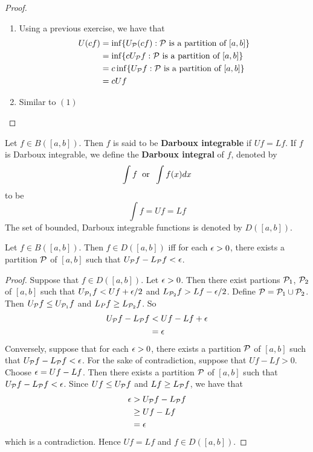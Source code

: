 \documentclass{book}
\begin{document}
	\begin{proof}\
		\begin{enumerate}
			\item Using a previous exercise, we have that
			\begin{align*}
				U(cf) 
				&= \inf \{U_{\mathcal{P}} (cf): \mathcal{P} \text{ is a partition of } [a,b]\} \\
				&= \inf \{c U_{\mathcal{P}} f: \mathcal{P} \text{ is a partition of } [a,b]\} \\
				&= c \inf \{U_{\mathcal{P}} f: \mathcal{P} \text{ is a partition of } [a,b]\} \\
				&= c Uf
			\end{align*}
			\item Similar to $(1)$
		\end{enumerate}
	\end{proof}

	\begin{defn}  
		Let $f \in B([a,b])$. Then $f$ is said to be \textbf{Darboux integrable} if $Uf = Lf$. If $f$ is Darboux integrable, we define the \textbf{Darboux integral} of $f$, denoted by $$\int f \hspace{.2cm} \text{or} \hspace{.2cm} \int f(x) dx$$ to be $$\int f = Uf = Lf$$ The set of bounded, Darboux integrable functions is denoted by $D([a,b])$.
	\end{defn}

	\begin{ex}  
		Let $f \in B([a,b])$. Then $f \in D([a,b])$ iff for each $\epsilon >0$, there exists a partition $\mathcal{P}$ of $[a,b]$ such that $U_{\mathcal{P}} f - L_{\mathcal{P}} f < \epsilon$.
	\end{ex}

	\begin{proof}
		Suppose that $f \in D([a,b])$. Let $\epsilon >0$. Then there exist partions $\mathcal{P}_1$, $\mathcal{P}_2$ of $[a,b]$ such that $U_{\mathcal{P}_1} f < Uf + \epsilon/2$ and $L_{\mathcal{P}_2} f > Lf - \epsilon/2$. Define $\mathcal{P} = \mathcal{P}_1 \cup \mathcal{P}_2$. Then $U_{\mathcal{P}} f \leq U_{\mathcal{P}_1} f$ and $L_P f \geq L_{\mathcal{P}_2}f$. So  
		\begin{align*}
			U_{\mathcal{P}} f - L_{\mathcal{P}} f 
			&< Uf - L f + \epsilon \\
			&= \epsilon
		\end{align*}  
		Conversely, suppose that for each $\epsilon >0$, there exists a partition $\mathcal{P}$ of $[a,b]$ such that $U_{\mathcal{P}} f - L_{\mathcal{P}} f < \epsilon$. For the sake of contradiction, suppose that $Uf - Lf > 0$. Choose $\epsilon = Uf - Lf$. Then there exists a partition $\mathcal{P}$ of $[a,b]$ such that $U_{\mathcal{P}} f - L_{\mathcal{P}} f < \epsilon$. Since $Uf \leq U_{\mathcal{P}} f$ and $Lf \geq L_{\mathcal{P}} f$, we have that 
		\begin{align*}
			\epsilon 
			&> U_{\mathcal{P}} f - L_{\mathcal{P}} f \\
			&\geq Uf - Lf \\
			&= \epsilon
		\end{align*} 
		which is a contradiction. Hence $Uf = Lf$ and $f \in D([a,b])$.
	\end{proof}
\end{document}
